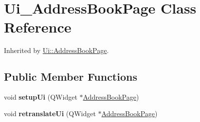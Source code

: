 \hypertarget{class_ui___address_book_page}{}\section{Ui\+\_\+\+Address\+Book\+Page Class Reference}
\label{class_ui___address_book_page}


Inherited by \mbox{\hyperlink{class_ui_1_1_address_book_page}{Ui\+::\+Address\+Book\+Page}}.

\subsection*{Public Member Functions}
\begin{DoxyCompactItemize}
\item 
\mbox{\label{class_ui___address_book_page_a4ded4cab0f58e965f264a0d805f5fe36}} 
void {\bfseries setup\+Ui} (Q\+Widget $\ast$\mbox{\hyperlink{class_address_book_page}{Address\+Book\+Page}})
\item 
\mbox{\label{class_ui___address_book_page_a68fa33d1c4429df76a63367fc9af2b76}} 
void {\bfseries retranslate\+Ui} (Q\+Widget $\ast$\mbox{\hyperlink{class_address_book_page}{Address\+Book\+Page}})
\end{DoxyCompactItemize}
